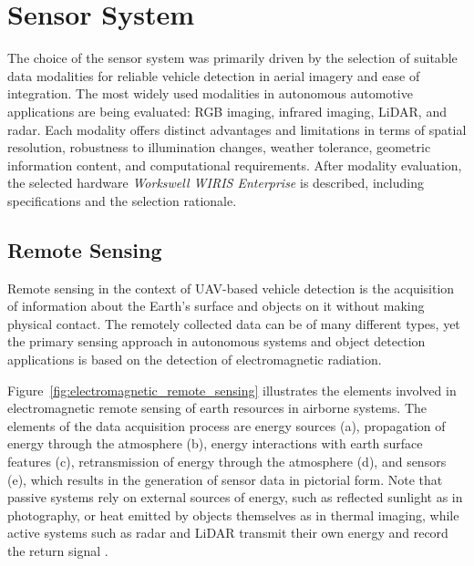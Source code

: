 \documentclass[12pt,oneside,bibtotoc,liststotoc]{scrbook}
\begin{document}
\vspace{-2.5em}
\section{Sensor System}
\vspace{-0.5em}

The choice of the sensor system was primarily driven by the
selection of suitable data modalities for reliable vehicle
detection in aerial imagery and ease of integration.
The most widely used modalities in autonomous automotive
applications are being evaluated: RGB imaging, infrared
imaging, LiDAR, and radar. Each modality offers
distinct advantages and limitations in terms of spatial
resolution, robustness to illumination changes, weather
tolerance, geometric information content, and computational
requirements. After modality evaluation, the selected
hardware \textit{Workswell WIRIS Enterprise} is described,
including specifications and the selection rationale.

\vspace{-1em}
\subsection{Remote Sensing}

Remote sensing in the context of UAV-based vehicle detection is
the acquisition of information about the Earth's surface and objects on it
without making physical contact. The remotely collected data can
be of many different types, yet the primary sensing approach in
autonomous systems and object detection applications is
based on the detection of electromagnetic radiation.
\cite[p.~1]{lillesand2015remoteSensing}

Figure~\ref{fig:electromagnetic_remote_sensing} illustrates
the elements involved in electromagnetic remote sensing of earth
resources in airborne systems.  The elements of the data
acquisition process are energy sources (a), propagation of energy
through the atmosphere (b), energy interactions with earth surface
features (c), retransmission of energy through the atmosphere (d),
and sensors (e), which results in the generation
of sensor data in pictorial form.
\cite[p.~2]{lillesand2015remoteSensing}
Note that passive systems rely on external sources of energy, such
as reflected sunlight as in photography, or heat emitted by objects
themselves as in thermal imaging, while active systems such as
radar and LiDAR transmit their own energy and record the return signal
\cite[p.~9,45]{lillesand2015remoteSensing}.
\end{document}
